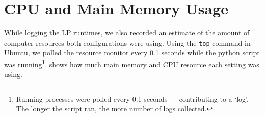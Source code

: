\section{CPU and Main Memory Usage} \label{app:CPU and Main Memory Usage}
While logging the LP runtimes, we also recorded an estimate of the amount of computer resources both configurations were using. Using the \texttt{top} command in Ubuntu, we polled the resource monitor every 0.1 seconds while the python script was running\footnote{\label{foo:logs not epochs} Running processes were polled every 0.1 seconds --- contributing to a `log'. The longer the script ran, the more number of logs collected.}.  shows how much main memory and CPU resource each setting was using.

